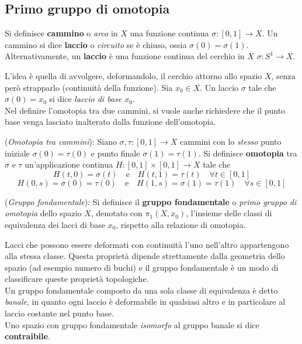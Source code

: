 \subsection{Primo gruppo di omotopia}
\begin{definition}
   Si definisce \textbf{cammino} o \emph{arco} in $X$ una funzione continua
   $\sigma : [0,1] \to X$. Un cammino si dice \textbf{laccio} o \emph{circuito}
   se è chiuso, ossia $\sigma(0) = \sigma(1)$.\\
   Alternativamente, un \textbf{laccio} è una funzione continua del cerchio in $X$
   $\sigma : S^1 \to X$.
\end{definition}
L'idea è quella di avvolgere, deformandolo, il cerchio attorno allo spazio $X$,
senza però strapparlo (continuità della funzione).
Sia $x_0 \in X$. Un laccio $\sigma$ tale che $\sigma(0) = x_0$ si dice
\emph{laccio di base $x_0$}.\\

Nel definire l'omotopia tra due cammini, si vuole anche richiedere che il
punto base venga lasciato inalterato dalla funzione dell'omotopia.

\begin{definition}(\emph{Omotopia tra cammini}):
   Siano $\sigma,\tau : [0,1] \to X$ cammini con lo \emph{stesso} punto iniziale
   $\sigma(0) = \tau(0)$ e punto finale $\sigma(1) = \tau(1)$.
   Si definisce \textbf{omotopia} tra $\sigma$ e $\tau$ un'applicazione continua
   $H : [0,1] \times [0,1] \to X$ tale che
      $$ H(t,0) = \sigma(t) \quad \mathrm{e} \quad H(t,1) = \tau(t)
         \quad \forall t \in [0,1]$$
      $$ H(0,s) = \sigma(0) = \tau(0) \quad \mathrm{e} \quad
         H(1,s) = \sigma(1) = \tau(1) \quad \forall s \in [0,1] $$
\end{definition}

\begin{definition}(\emph{Gruppo fondamentale}):
   Si definisce il \textbf{gruppo fondamentale} o \emph{primo gruppo di omotopia}
   dello spazio $X$, denotato con $\pi_1(X,x_0)$, l'insieme delle classi di
   equivalenza dei lacci di base $x_0$, rispetto alla relazione di omotopia.
\end{definition}

Lacci che possono essere deformati con continuità l'uno nell'altro appartengono
alla stessa classe. Questa proprietà dipende strettamente dalla geometria dello
spazio (ad esempio numero di buchi) e il gruppo fondamentale è un modo di classificare
queste proprietà topologiche.\\
Un gruppo fondamentale composto da una sola classe di equivalenza è detto \emph{banale},
in quanto ogni laccio è deformabile in qualsiasi altro e in particolare al laccio
costante nel punto base.\\
Uno spazio con gruppo fondamentale \emph{isomorfo} al gruppo banale si dice
\textbf{contraibile}. \\

